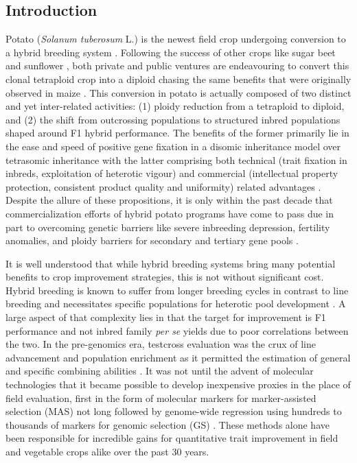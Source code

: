 \begin{refsection}
\newpage

\section{Introduction}

Potato (\emph{Solanum tuberosum} L.) is the newest field crop
undergoing conversion to a hybrid breeding system
\parencite{DeVries2023,Jansky2016}. Following the success of other crops
like sugar beet \parencite{McGrath2018} and sunflower
\parencite{Dimitrijevic2018}, both private and public ventures are
endeavouring to convert this clonal tetraploid crop into a diploid
chasing the same benefits that were originally observed in maize
\parencite{Duvick1997}. This conversion in potato is actually composed of
two distinct and yet inter-related activities: (1) ploidy reduction from
a tetraploid to diploid, and (2) the shift from outcrossing populations
to structured inbred populations shaped around F1 hybrid performance.
The benefits of the former primarily lie in the ease and speed of
positive gene fixation in a disomic inheritance model over tetrasomic
inheritance \parencite{Hougas1958} with the latter comprising both
technical (trait fixation in inbreds, exploitation of heterotic vigour)
and commercial (intellectual property protection, consistent product
quality and uniformity) related advantages \parencite{Wright1980}.
Despite the allure of these propositions, it is only within the past
decade that commercialization efforts of hybrid potato programs have
come to pass due in part to overcoming genetic barriers like severe
inbreeding depression, fertility anomalies, and ploidy barriers for
secondary and tertiary gene pools
\parencite{Zhang2019,Endelman2016,Zhang2021}.

It is well understood that while hybrid breeding systems bring many
potential benefits to crop improvement strategies, this is not without
significant cost. Hybrid breeding is known to suffer from longer
breeding cycles in contrast to line breeding and necessitates specific
populations for heterotic pool development
\parencite{Labroo2021,Longin2013}. A large aspect of that complexity lies
in that the target for improvement is F1 performance and not inbred
family \emph{per se} yields due to poor correlations between the two. In
the pre-genomics era, testcross evaluation was the crux of line
advancement and population enrichment as it permitted the estimation of
general and specific combining abilities \parencite{Carangal1971}. It was
not until the advent of molecular technologies that it became possible
to develop inexpensive proxies in the place of field evaluation, first
in the form of molecular markers for marker-assisted selection (MAS) not
long followed by genome-wide regression using hundreds to thousands of
markers for genomic selection (GS) \parencite{Lande1990,Meuwissen2001}.
These methods alone have been responsible for incredible gains for
quantitative trait improvement in field and vegetable crops alike over
the past 30 years.


\end{refsection}
